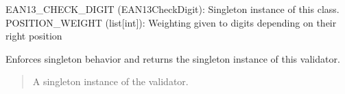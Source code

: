 \documentclass[letterpaper,10pt,english]{sphinxmanual}
\begin{document}
\begin{fulllineitems}
\begin{fulllineitems}
\begin{quote}
\begin{description}
\end{description}\end{quote}

\end{fulllineitems}

\begin{description}
\sphinxAtStartPar
EAN13\_CHECK\_DIGIT (EAN13CheckDigit): Singleton instance of this class.
POSITION\_WEIGHT (list{[}int{]}): Weighting given to digits depending on their right position

\end{description}

\begin{fulllineitems}
\label{\detokenize{apache_commons_validator_python.routines.checkdigit:apache_commons_validator_python.routines.checkdigit.ean13_checkdigit.EAN13CheckDigit.EAN13_CHECK_DIGIT}}
\pysigstartsignatures
{}
\pysigstopsignatures
\sphinxAtStartPar
Enforces singleton behavior and returns the singleton instance of this
validator.
\begin{quote}\begin{description}
\sphinxAtStartPar
A singleton instance of the validator.

\end{description}\end{quote}

\end{fulllineitems}


\end{fulllineitems}
\end{document}

